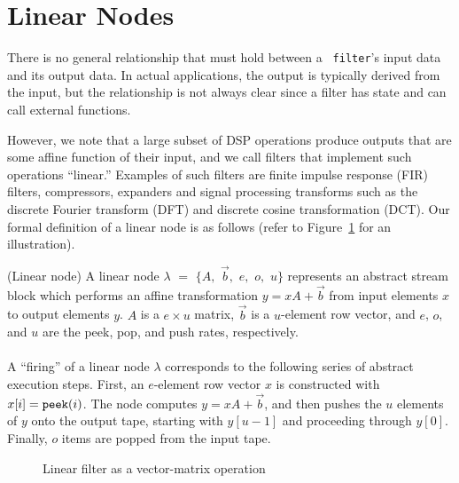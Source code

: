 \section{Linear Nodes}
\label{sec:linearrep}

There is no general relationship that must hold between a {\tt
filter}'s input data and its output data. In actual applications, the
output is typically derived from the input, but the relationship is
not always clear since a filter has state and can call external
functions.

However, we note that a large subset of DSP operations produce outputs
that are some affine function of their input, and we call
filters that implement such operations ``linear.''  Examples of such
filters are finite impulse response (FIR) filters, compressors,
expanders and signal processing transforms such as the discrete
Fourier transform (DFT) and discrete cosine transformation (DCT).  Our
formal definition of a linear node is as follows (refer to
Figure~\ref{fig:overview-matrix} for an illustration).

\begin{definition}(Linear node)
A linear node $\lambda$ $=$ $\{A,$ ${\vec b},$ $e,$ $o,$ $u\}$ represents an
abstract stream block which performs an affine transformation $y = x A
+ {\vec b}$ from input elements $x$ to output elements $y$.  
$A$ is a $e \times u$ matrix, 
${\vec b}$ is a $u$-element row vector, and $e$, $o$, and
$u$ are the peek, pop, and push rates, respectively. \\ ~ \\
%
A ``firing'' of a linear node $\lambda$ corresponds to the following
series of abstract execution steps.  First, an $e$-element row vector
$x$ is constructed with $x[i] = \mbox{\tt peek}(i)$.  The node
computes $y = x A + {\vec b}$, and then pushes the $u$ elements of $y$ onto
the output tape, starting with $y[u-1]$ and proceeding through $y[0]$.
Finally, $o$ items are popped from the input tape.
\end{definition}

\begin{figure}[t]
\center
\epsfxsize=3.0in
\vspace{-12pt}
\caption{Linear filter as a vector-matrix operation}
\label{fig:overview-matrix}
\vspace{-12pt}
\end{figure}


